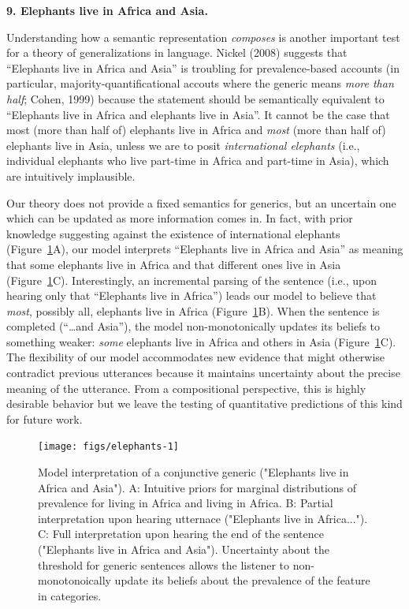 \documentclass[english,,man,floatsintext]{apa6}
\theoremstyle{definition}
\theoremstyle{definition}
\theoremstyle{definition}
\theoremstyle{remark}
\begin{document}
\textbf{9. Elephants live in Africa and Asia.}

Understanding how a semantic representation \emph{composes} is another
important test for a theory of generalizations in language. Nickel
(2008) suggests that \enquote{Elephants live in Africa and Asia} is
troubling for prevalence-based accounts (in particular,
majority-quantificational accouts where the generic means \emph{more
than half}; Cohen, 1999) because the statement should be semantically
equivalent to \enquote{Elephants live in Africa and elephants live in
Asia}. It cannot be the case that most (more than half of) elephants
live in Africa and \emph{most} (more than half of) elephants live in
Asia, unless we are to posit \emph{international elephants} (i.e.,
individual elephants who live part-time in Africa and part-time in
Asia), which are intuitively implausible.

Our theory does not provide a fixed semantics for generics, but an
uncertain one which can be updated as more information comes in. In
fact, with prior knowledge suggesting against the existence of
international elephants (Figure~\ref{fig:elephants}A), our model
interprets \enquote{Elephants live in Africa and Asia} as meaning that
some elephants live in Africa and that different ones live in Asia
(Figure~\ref{fig:elephants}C). Interestingly, an incremental parsing of
the sentence (i.e., upon hearing only that \enquote{Elephants live in
Africa}) leads our model to believe that \emph{most}, possibly all,
elephants live in Africa (Figure~\ref{fig:elephants}B). When the
sentence is completed (\enquote{\ldots{}and Asia}), the model
non-monotonically updates its beliefs to something weaker: \emph{some}
elephants live in Africa and others in Asia
(Figure~\ref{fig:elephants}C). The flexibility of our model accommodates
new evidence that might otherwise contradict previous utterances because
it maintains uncertainty about the precise meaning of the utterance.
From a compositional perspective, this is highly desirable behavior but
we leave the testing of quantitative predictions of this kind for future
work.

\begin{figure}

{\centering \texttt{[image: figs/elephants-1]} 

}

\caption{Model interpretation of a conjunctive generic ("Elephants live in Africa and Asia"). A: Intuitive priors for marginal distributions of prevalence for living in Africa and living in Africa. B: Partial interpretation upon hearing utternace ("Elephants live in Africa..."). C: Full interpretation upon hearing the end of the sentence ("Elephants live in Africa and Asia"). Uncertainty about the threshold for generic sentences allows the listener to non-monotonoically update its beliefs about the prevalence of the feature in categories.}\label{fig:elephants}
\end{figure}
\end{document}
